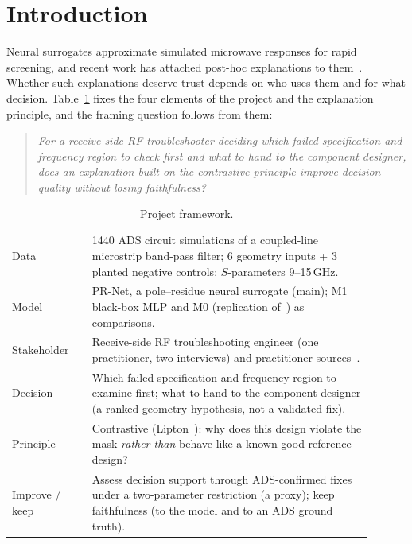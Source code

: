 \documentclass[conference,10pt]{IEEEtran}
\begin{document}
\section{Introduction}
Neural surrogates approximate simulated microwave responses for rapid screening, and recent work has attached post-hoc explanations to them~\cite{suslova2026}.
Whether such explanations deserve trust depends on who uses them and for what decision.
Table~\ref{tab:frame} fixes the four elements of the project and the explanation principle, and the framing question follows from them:

\begin{quote}
\emph{For a receive-side RF troubleshooter deciding which failed specification and frequency region to check first and what to hand to the component designer, does an explanation built on the contrastive principle improve decision quality without losing faithfulness?}
\end{quote}

\begin{table}[htbp]
\centering
\caption{Project framework.}
\label{tab:frame}
\small
\begin{tabular}{p{0.20\linewidth}p{0.70\linewidth}}
\toprule
Data & 1440 ADS circuit simulations of a coupled-line microstrip band-pass filter; 6 geometry inputs + 3 planted negative controls; $S$-parameters 9--15\,GHz. \\
Model & PR-Net, a pole--residue neural surrogate (main); M1 black-box MLP and M0 (replication of~\cite{suslova2026}) as comparisons. \\
Stakeholder & Receive-side RF troubleshooting engineer (one practitioner, two interviews) and practitioner sources~\cite{rs_evm,adi_an1354}. \\
Decision & Which failed specification and frequency region to examine first; what to hand to the component designer (a ranked geometry hypothesis, not a validated fix). \\
Principle & Contrastive (Lipton~\cite{lipton1990}): why does this design violate the mask \emph{rather than} behave like a known-good reference design? \\
Improve / keep & Assess decision support through ADS-confirmed fixes under a two-parameter restriction (a proxy); keep faithfulness (to the model and to an ADS ground truth). \\
\bottomrule
\end{tabular}
\end{table}
\end{document}
